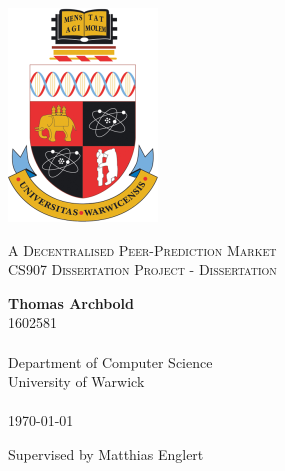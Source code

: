 \documentclass[10pt,a4paper]{article}
\theoremstyle{plain}
\theoremstyle{definition}
\begin{document}
\begin{titlepage}
    \begin{center}

        \vspace*{2cm}
        \includegraphics[width=.25\textwidth]{crest.png}

        \vspace*{1cm}
		{\Large \textsc{A Decentralised Peer-Prediction Market}} \\
		{\textsc{CS907 Dissertation Project - Dissertation}}

        \vspace*{1cm}
        \textbf{Thomas Archbold} \\
		1602581 \\~\\
        Department of Computer Science \\
        University of Warwick \\~\\

		\today

		\vspace*{1cm}

		Supervised by Matthias Englert

        \vfill

    \end{center}
\end{titlepage}

% 
%
\end{document}
